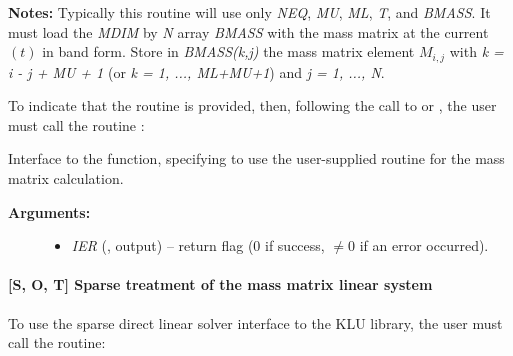 \documentclass[letterpaper,10pt,english]{sphinxmanual}
\begin{document}
\begin{fulllineitems}
\begin{description}
\begin{itemize}
\end{itemize}

\end{description}

\textbf{Notes:}
Typically this routine will use only \emph{NEQ}, \emph{MU}, \emph{ML}, \emph{T}, and
\emph{BMASS}. It must load the \emph{MDIM} by \emph{N} array \emph{BMASS} with the mass
matrix at the current \((t)\) in band form.  Store in
\emph{BMASS(k,j)} the mass matrix element \(M_{i,j}\) with
\emph{k = i - j + MU + 1} (or \emph{k = 1, ..., ML+MU+1}) and \emph{j = 1, ..., N}.

\end{fulllineitems}


To indicate that the {\hyperref[f_interface/Usage:f/_/FARKBMASS]{\emph{}}} routine is provided, then,
following the call to {\hyperref[f_interface/Usage:f/_/FARKMASSBAND]{\emph{}}} or
{\hyperref[f_interface/Usage:f/_/FARKMASSLAPACKBAND]{\emph{}}}, the user must call the routine
{\hyperref[f_interface/Usage:f/_/FARKBANDSETMASS]{\emph{}}}:

\begin{fulllineitems}
\label{f_interface/Usage:f/_/FARKBANDSETMASS}
Interface to the {\hyperref[c_interface/User_callable:c.ARKDlsSetBandMassFn]{\emph{}}} function, specifying
to use the user-supplied routine {\hyperref[f_interface/Usage:f/_/FARKBMASS]{\emph{}}} for the mass
matrix calculation.
\begin{description}
\item[{\textbf{Arguments:}}] \leavevmode\begin{itemize}
\item {} 
\emph{IER} (, output) -- return flag (0 if success,
\(\ne 0\) if an error occurred).

\end{itemize}

\end{description}

\end{fulllineitems}



\paragraph{{[}\textbf{S}, \textbf{O}, \textbf{T}{]} Sparse treatment of the mass matrix linear system}
\label{f_interface/Usage:s-o-t-sparse-treatment-of-the-mass-matrix-linear-system}
To use the sparse direct linear solver interface to the KLU library,
the user must call the {\hyperref[f_interface/Usage:f/_/FARKMASSKLU]{\emph{}}} routine:
\end{document}
